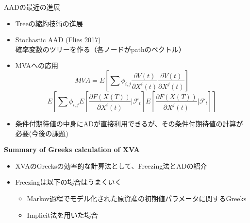 \documentclass[driverfallback=dvipdfmx,cjk]{beamer}
\begin{document}
\begin{frame}
    AADの最近の進展
    \begin{itemize}
        \item Treeの縮約技術の進展
        \item Stochastic AAD (Flies 2017) \\
        確率変数のツリーを作る（各ノードがpathのベクトル）
        \item MVAへの応用
        $$MVA =E[ \sum \phi_{i,j} \frac{\partial V(t)}{\partial X^i(t)} \frac{\partial V(t)}{\partial X^j(t)}]$$
        $$E\left[ \sum \phi_{i,j}  E\left[ \frac{\partial F(X(T))}{\partial X^i(t)} | \mathcal{F}_t\right] E\left[ \frac{\partial F(X(T))}{\partial X^j(t)} | \mathcal{F}_t \right] \right]$$
        \item 条件付期待値の中身にADが直接利用できるが、その条件付期待値の計算が必要(今後の課題)
    \end{itemize}
\end{frame}

\begin{frame}
  \textbf{Summary of Greeks calculation of XVA}  
  \begin{itemize}
      \item XVAのGreeksの効率的な計算法として、Freezing法とADの紹介
      \item Freezingは以下の場合はうまくいく
      \begin{itemize}
          \item Markov過程でモデル化された原資産の初期値パラメータに関するGreeks
          \item Implicit法を用いた場合
      \end{itemize}
  \end{itemize}
\end{frame}
\end{document}
